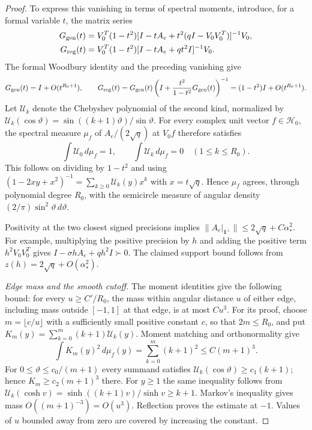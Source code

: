 \begin{proof}
To express this vanishing in terms of spectral moments, introduce, for a
formal variable $t$, the matrix series
\begin{align*}
 G_{\rm gen}(t)
  &=V_0^T(1-t^2)
    [I-tA_e+t^2(qI-V_0V_0^T)]^{-1}V_0,\\
 G_{\rm reg}(t)
  &=V_0^T(1-t^2)[I-tA_e+qt^2I]^{-1}V_0.
\end{align*}
The formal Woodbury identity and the preceding vanishing give
\[
 G_{\rm gen}(t)=I+O(t^{R_0+1}),\qquad
 G_{\rm reg}(t)
 =G_{\rm gen}(t)
    \left(I+\frac{t^2}{1-t^2}G_{\rm gen}(t)\right)^{-1}
 =(1-t^2)I+O(t^{R_0+1}).
\]
Let $\mathcal U_k$ denote the Chebyshev polynomial of the second kind,
normalized by
$\mathcal U_k(\cos\vartheta)
 =\sin((k+1)\vartheta)/\sin\vartheta$.
For every complex unit vector $f\in\mathcal H_0$, the spectral measure
$\mu_f$ of $A_e/(2\sqrt q)$ at $V_0f$ therefore satisfies
\[
 \int\mathcal U_0\,d\mu_f=1,
 \qquad \int\mathcal U_k\,d\mu_f=0
       \quad(1\le k\le R_0).
\]
This follows on dividing by $1-t^2$ and using
$(1-2xy+x^2)^{-1}=\sum_{k\ge0}\mathcal U_k(y)x^k$ with
$x=t\sqrt q$.  Hence $\mu_f$ agrees, through polynomial degree $R_0$,
with the semicircle measure of angular density
$(2/\pi)\sin^2\vartheta\,d\vartheta$.

Positivity at the two closest signed precisions implies
$\|A_e|_{\mathbf1^\perp}\|\le2\sqrt q+C\alpha_*^2$.
For example, multiplying the positive precision by $h$ and adding the
positive term $h^2V_0V_0^T$ gives
$I-\sigma hA_e+qh^2I\succ0$.
The claimed support bound follows from
$z(h)=2\sqrt q+O(\alpha_*^2)$.

\par\smallskip\noindent
\textit{Edge mass and the smooth cutoff.}
The moment identities give the following bound: for every
$u\ge C'/R_0$, the mass within angular distance $u$ of either edge,
including mass outside $[-1,1]$ at that edge, is at most $Cu^3$.
For its proof, choose $m=\lfloor c/u\rfloor$ with a sufficiently small
positive constant $c$, so that $2m\le R_0$, and put
$K_m(y)=\sum_{k=0}^m(k+1)\mathcal U_k(y)$.
Moment matching and orthonormality give
\[
 \int K_m(y)^2\,d\mu_f(y)
 =\sum_{k=0}^m(k+1)^2\le C(m+1)^3.
\]
For $0\le\vartheta\le c_0/(m+1)$ every summand satisfies
$\mathcal U_k(\cos\vartheta)\ge c_1(k+1)$; hence
$K_m\ge c_2(m+1)^3$ there.  For $y\ge1$ the same inequality follows
from $\mathcal U_k(\cosh v)=\sinh((k+1)v)/\sinh v\ge k+1$.
Markov's inequality gives mass $O((m+1)^{-3})=O(u^3)$.
Reflection proves the estimate at $-1$.  Values of $u$ bounded away
from zero are covered by increasing the constant.


\end{proof}
